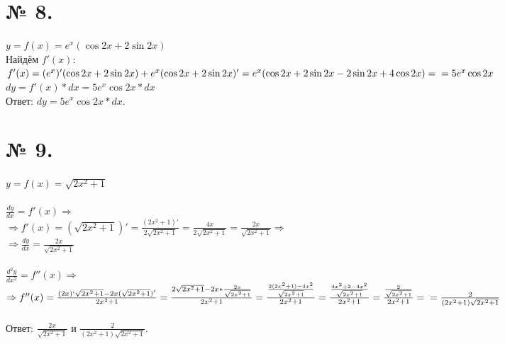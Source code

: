 \documentclass[a4paper,12pt]{report}
\begin{document}
\section{№ 8.}
$y = f(x) = e^x(\cos{2x} + 2\sin{2x})$\\
Найдём $f'(x)$:\\
$f'(x) = (e^x)'(\cos{2x} + 2\sin{2x}) + e^x(\cos{2x} + 2\sin{2x})' = e^x(\cos{2x} + 2\sin{2x} - 2\sin{2x} + 4\cos{2x}) = \\
= 5e^x\cos{2x}$\\
$dy = f'(x) * dx = 5e^x\cos{2x} * dx$\\
Ответ: $dy = 5e^x\cos{2x} * dx$.
\section{№ 9.}
$y = f(x) = \sqrt{2x^2 + 1}$\\\\
$\frac{dy}{dx} = f'(x) \Rightarrow$\\
$\Rightarrow f'(x) =  (\sqrt{2x^2 + 1})' = \frac{(2x^2 + 1)'}{2\sqrt{2x^2 + 1}} = \frac{4x}{2\sqrt{2x^2 + 1}} = \frac{2x}{\sqrt{2x^2 + 1}}
\Rightarrow $\\
$\Rightarrow \frac{dy}{dx} = \frac{2x}{\sqrt{2x^2 + 1}}$\\\\
$\frac{d^2y}{dx^2} = f''(x) \Rightarrow$\\
$\Rightarrow f''(x) = \frac{(2x)`\sqrt{2x^2 + 1} - 2x(\sqrt{2x^2 + 1})'}{2x^2 + 1} = 
\frac{2\sqrt{2x^2 + 1} - 2x * \frac{2x}{\sqrt{2x^2 + 1}}}{2x^2 + 1} = 
\frac{\frac{2(2x^2 + 1) - 4x^2}{\sqrt{2x^2 + 1}}}{2x^2 + 1} = \frac{\frac{4x^2 + 2 - 4x^2}{\sqrt{2x^2 + 1}}}{2x^2 + 1} =
\frac{\frac{2}{\sqrt{2x^2 + 1}}}{2x^2 + 1} =\\\\ = \frac{2}{(2x^2 +1)\sqrt{2x^2 + 1}}$\\\\
Ответ: $\frac{2x}{\sqrt{2x^2 + 1}}$ и $\frac{2}{(2x^2 +1)\sqrt{2x^2 + 1}}$.
\end{document}
